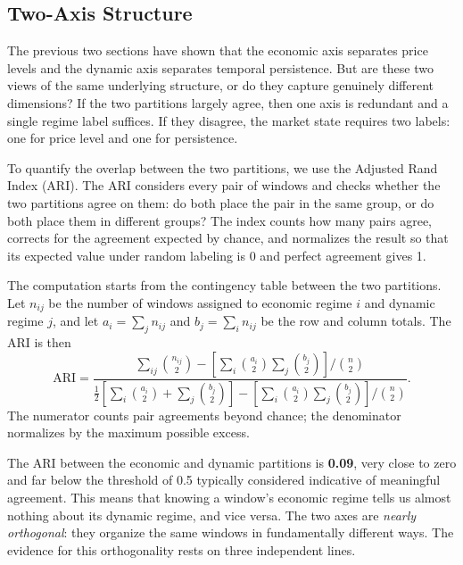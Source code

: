 \documentclass[12pt]{article}
\begin{document}
\subsection{Two-Axis Structure}
\label{sec:two_axes}

The previous two sections have shown that the economic axis separates price levels and the dynamic axis separates temporal persistence.
But are these two views of the same underlying structure, or do they capture genuinely different dimensions?
If the two partitions largely agree, then one axis is redundant and a single regime label suffices.
If they disagree, the market state requires two labels: one for price level and one for persistence.

To quantify the overlap between the two partitions, we use the Adjusted Rand Index (ARI).
The ARI considers every pair of windows and checks whether the two partitions agree on them: do both place the pair in the same group, or do both place them in different groups?
The index counts how many pairs agree, corrects for the agreement expected by chance, and normalizes the result so that its expected value under random labeling is 0 and perfect agreement gives 1.

The computation starts from the contingency table between the two partitions.
Let $n_{ij}$ be the number of windows assigned to economic regime $i$ and dynamic regime $j$, and let $a_i = \sum_j n_{ij}$ and $b_j = \sum_i n_{ij}$ be the row and column totals.
The ARI is then
\begin{equation}
\text{ARI} = \frac{\sum_{ij}\binom{n_{ij}}{2} - \left[\sum_i\binom{a_i}{2}\sum_j\binom{b_j}{2}\right]\!/\!\binom{n}{2}}{\frac{1}{2}\!\left[\sum_i\binom{a_i}{2}+\sum_j\binom{b_j}{2}\right] - \left[\sum_i\binom{a_i}{2}\sum_j\binom{b_j}{2}\right]\!/\!\binom{n}{2}}.
\label{eq:ari}
\end{equation}
The numerator counts pair agreements beyond chance; the denominator normalizes by the maximum possible excess.

The ARI between the economic and dynamic partitions is \textbf{0.09}, very close to zero and far below the threshold of 0.5 typically considered indicative of meaningful agreement.
This means that knowing a window's economic regime tells us almost nothing about its dynamic regime, and vice versa.
The two axes are \emph{nearly orthogonal}: they organize the same windows in fundamentally different ways.
The evidence for this orthogonality rests on three independent lines.
\end{document}
